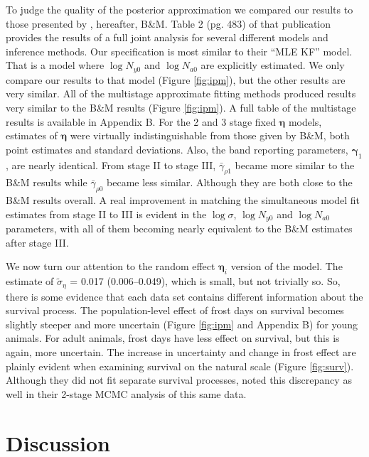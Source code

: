 \documentclass[12pt]{article}
\newcommand{\bn}{\boldsymbol{\eta}}
\newcommand{\bg}{\boldsymbol{\gamma}}
\begin{document}
To judge the quality of the posterior approximation we compared our results to those presented by \citet{besbeas2019exact}, hereafter, B\&M. Table 2 (pg. 483) of that publication provides the results of a full joint analysis for several different models and inference methods. Our specification is most similar to their ``MLE KF'' model. That is a model where $\log N_{y0}$ and $\log N_{a0}$ are explicitly estimated.  We only compare our results to that model (Figure \ref{fig:ipm}), but the other results are very similar. All of the multistage approximate fitting methods produced results very similar to  the B\&M results (Figure \ref{fig:ipm}). A full table of the multistage results is available in Appendix B. For the 2 and 3 stage fixed $\bn$ models, estimates of $\bn$ were virtually indistinguishable from those given by B\&M, both point estimates and standard deviations. Also, the band reporting parameters, $\bg_1$, are nearly identical. From stage II to stage III, $\bar{\gamma}_{\rho 1}$ became more similar to the B\&M results while $\bar{\gamma}_{\rho 0}$ became less similar. Although they are both close to the B\&M results overall. A real improvement in matching the simultaneous model fit estimates from stage II to III is evident in the $\log \sigma$, $\log N_{y0}$ and $\log N_{a0}$ parameters, with all of them becoming nearly equivalent to the B\&M estimates after stage III.  

We now turn our attention to the random effect $\bn_i$ version of the model. The estimate of $\tilde{\sigma}_\eta$ = 0.017 (0.006--0.049), which is small, but not trivially so. So, there is some evidence that each data set contains different information about the survival process. The population-level effect of frost days on survival becomes slightly steeper and more uncertain (Figure \ref{fig:ipm} and Appendix B) for young animals. For adult animals, frost days have less effect on survival, but this is again, more uncertain. The increase in uncertainty and change in frost effect are plainly evident when examining survival on the natural scale (Figure \ref{fig:surv}). Although they did not fit separate survival processes, \citet{goudie2019joining} noted this discrepancy as well in their 2-stage MCMC analysis of this same data.          


\section{Discussion}
\end{document}
